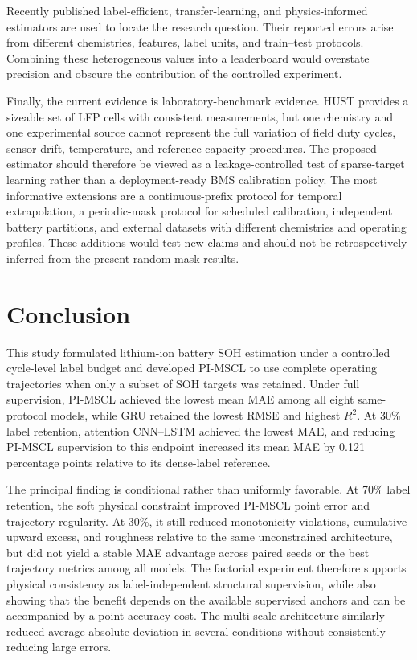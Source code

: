 \documentclass[pdflatex,sn-mathphys-num]{sn-jnl}
\begin{document}
Recently published label-efficient, transfer-learning, and physics-informed estimators are used to locate the research question. Their reported errors arise from different chemistries, features, label units, and train--test protocols. Combining these heterogeneous values into a leaderboard would overstate precision and obscure the contribution of the controlled experiment.

Finally, the current evidence is laboratory-benchmark evidence. HUST provides a sizeable set of LFP cells with consistent measurements, but one chemistry and one experimental source cannot represent the full variation of field duty cycles, sensor drift, temperature, and reference-capacity procedures. The proposed estimator should therefore be viewed as a leakage-controlled test of sparse-target learning rather than a deployment-ready BMS calibration policy. The most informative extensions are a continuous-prefix protocol for temporal extrapolation, a periodic-mask protocol for scheduled calibration, independent battery partitions, and external datasets with different chemistries and operating profiles. These additions would test new claims and should not be retrospectively inferred from the present random-mask results.

\section{Conclusion}
\label{sec:conclusion}

This study formulated lithium-ion battery SOH estimation under a controlled cycle-level label budget and developed PI-MSCL to use complete operating trajectories when only a subset of SOH targets was retained. Under full supervision, PI-MSCL achieved the lowest mean MAE among all eight same-protocol models, while GRU retained the lowest RMSE and highest $R^2$. At 30\% label retention, attention CNN--LSTM achieved the lowest MAE, and reducing PI-MSCL supervision to this endpoint increased its mean MAE by 0.121 percentage points relative to its dense-label reference.

The principal finding is conditional rather than uniformly favorable. At 70\% label retention, the soft physical constraint improved PI-MSCL point error and trajectory regularity. At 30\%, it still reduced monotonicity violations, cumulative upward excess, and roughness relative to the same unconstrained architecture, but did not yield a stable MAE advantage across paired seeds or the best trajectory metrics among all models. The factorial experiment therefore supports physical consistency as label-independent structural supervision, while also showing that the benefit depends on the available supervised anchors and can be accompanied by a point-accuracy cost. The multi-scale architecture similarly reduced average absolute deviation in several conditions without consistently reducing large errors.
\end{document}
